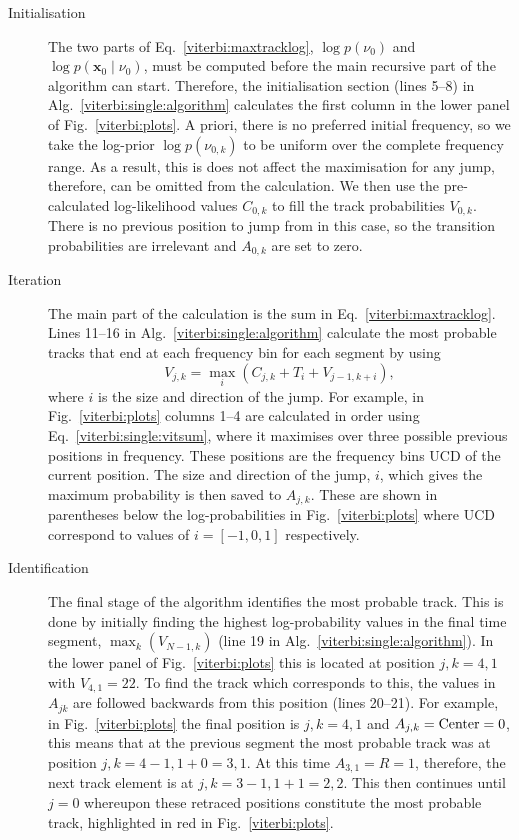 \begin{description}
%
%
\item[Initialisation] The two parts of Eq.~\ref{viterbi:maxtracklog},  $\log p(\nu_0)$ and $\log p({\bm x_0} \mid \nu_0)$, must be computed before the main recursive part of the algorithm can start. Therefore, the initialisation section (lines 5--8) in Alg.~\ref{viterbi:single:algorithm} calculates the first column in the lower panel of Fig.~\ref{viterbi:plots}. A priori, there is no preferred initial frequency, so we take the log-prior $\log p(\nu_{0,k})$ to be uniform over the complete frequency range. As a result, this is does not affect the maximisation for any jump, therefore, can be omitted from the calculation. We then use the pre-calculated log-likelihood values $C_{0,k}$ to fill the track probabilities $V_{0,k}$.  There is no previous position to jump from in this case, so the transition probabilities are irrelevant and $A_{0,k}$ are set to zero.
%
%
\item[Iteration] The main part of the calculation is the sum in Eq.~\ref{viterbi:maxtracklog}. Lines 11--16 in Alg.~\ref{viterbi:single:algorithm} calculate the most probable tracks that end at each frequency bin for each segment by using
    \begin{equation} \label{viterbi:single:vitsum}
    V_{j,k} = \max_{i}({C_{j,k} }+ T_{i} + V_{j-1,k+i}),
    \end{equation}
    where $i$ is the size and direction of the jump. For example, in Fig.~\ref{viterbi:plots} columns 1--4 are calculated in order using Eq.~\ref{viterbi:single:vitsum}, where it maximises over three possible previous positions in frequency. These positions are the frequency bins \ac{UCD} of the current position. The size and direction of the jump, $i$, which gives the maximum probability is then saved to $A_{j,k}$. These are shown in parentheses below the log-probabilities in Fig.~\ref{viterbi:plots} where \ac{UCD} correspond to values of $i = [-1,0,1]$ respectively.
%
%
\item[Identification] The final stage of the algorithm identifies the most probable track. This is done by initially finding the highest log-probability values in the final time segment, $\max_k(V_{N-1,k})$ (line 19 in Alg.~\ref{viterbi:single:algorithm}). In the lower panel of Fig.~\ref{viterbi:plots} this is located at position $j,k = 4,1$ with $V_{4,1} = 22$. To find the track which corresponds to this, the values in $A_{jk}$ are followed backwards from this position (lines 20--21). For example, in Fig.~\ref{viterbi:plots} the final position is $j,k = 4,1$ and $A_{j,k} = \rm{Center} = 0$, this means that at the previous segment the most probable track was at position $j,k = 4-1,1+0 = 3,1$. At this time $A_{3,1} = R = 1$, therefore, the next track element is at $j,k = 3-1,1+1 = 2,2$. This then continues until $j=0$ whereupon these retraced positions constitute the most probable track, highlighted in red in Fig.~\ref{viterbi:plots}.
%
\end{description}

